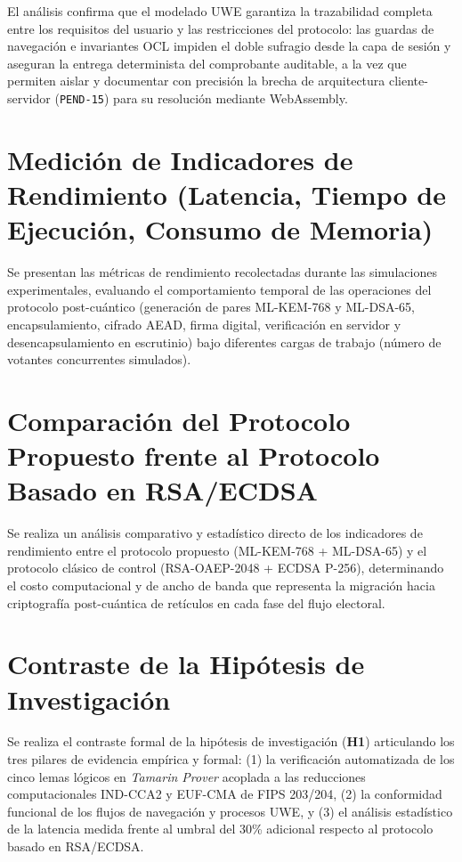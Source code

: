 El análisis confirma que el modelado UWE garantiza la trazabilidad completa entre los requisitos del usuario y las restricciones del protocolo: las guardas de navegación e invariantes OCL impiden el doble sufragio desde la capa de sesión y aseguran la entrega determinista del comprobante auditable, a la vez que permiten aislar y documentar con precisión la brecha de arquitectura cliente-servidor (\texttt{PEND-15}) para su resolución mediante WebAssembly.

\section{Medición de Indicadores de Rendimiento (Latencia, Tiempo de Ejecución, Consumo de Memoria)}

Se presentan las métricas de rendimiento recolectadas durante las simulaciones experimentales, evaluando el comportamiento temporal de las operaciones del protocolo post-cuántico (generación de pares ML-KEM-768 y ML-DSA-65, encapsulamiento, cifrado AEAD, firma digital, verificación en servidor y desencapsulamiento en escrutinio) bajo diferentes cargas de trabajo (número de votantes concurrentes simulados).

\section{Comparación del Protocolo Propuesto frente al Protocolo Basado en RSA/ECDSA}

Se realiza un análisis comparativo y estadístico directo de los indicadores de rendimiento entre el protocolo propuesto (ML-KEM-768 + ML-DSA-65) y el protocolo clásico de control (RSA-OAEP-2048 + ECDSA P-256), determinando el costo computacional y de ancho de banda que representa la migración hacia criptografía post-cuántica de retículos en cada fase del flujo electoral.

\section{Contraste de la Hipótesis de Investigación}

Se realiza el contraste formal de la hipótesis de investigación (\textbf{H1}) articulando los tres pilares de evidencia empírica y formal: (1) la verificación automatizada de los cinco lemas lógicos en \textit{Tamarin Prover} acoplada a las reducciones computacionales IND-CCA2 y EUF-CMA de FIPS 203/204, (2) la conformidad funcional de los flujos de navegación y procesos UWE, y (3) el análisis estadístico de la latencia medida frente al umbral del 30\% adicional respecto al protocolo basado en RSA/ECDSA.
